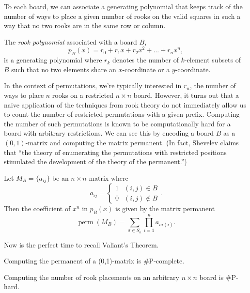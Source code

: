 To each board, we can associate a generating polynomial that keeps track of the
number of ways to place a given number of rooks on the valid squares in such a
way that no two rooks are in the same row or column.

\begin{definition}
  The \textit{rook polynomial} associated with a board $B$,
  \[
    p_B(x) = r_0 + r_1 x + r_2 x^2 + \dots + r_n x^n,
  \]
  is a generating polynomial where $r_k$ denotes the number of $k$-element subsets
  of $B$ such that no two elements share an $x$-coordinate or a $y$-coordinate.
\end{definition}

In the context of permutations, we're typically interested in $r_n$, the number
of ways to place $n$ rooks on a restricted $n \times n$ board.
However, it turns out that a naive application of the techniques from
rook theory do not immediately allow us to count the number of
restricted permutations with a given prefix.
Computing the number of such permutations is known to be computationally hard
for a board with arbitrary restrictions.
We can see this by encoding a board $B$ as a $(0,1)$-matrix and computing the matrix
permanent. (In fact, Shevelev \cite{Shevelev1992} claims that
``the theory of enumerating the permutations with restricted positions
stimulated the development of the theory of the permanent.'')

\begin{lemma}
  Let $M_B = \{a_{ij}\}$ be an $n \times n$ matrix where \[
    a_{ij} = \begin{cases}
      1 & (i,j) \in B \\
      0 & (i,j) \not\in B
    \end{cases}.
  \]
  Then the coefficient of $x^n$ in $p_B(x)$ is given by the matrix permanent
  \[
    \operatorname{perm}(M_B) = \sum_{\sigma \in S_n} \prod_{i=1}^n a_{i\sigma(i)}.
  \]
\end{lemma}

Now is the perfect time to recall Valiant's Theorem.

\begin{theorem}
  Computing the permanent of a (0,1)-matrix is \#P-complete.
\end{theorem}

\begin{corollary}
  Computing the number of rook placements on an arbitrary $n \times n$ board is
  \#P-hard.
\end{corollary}

